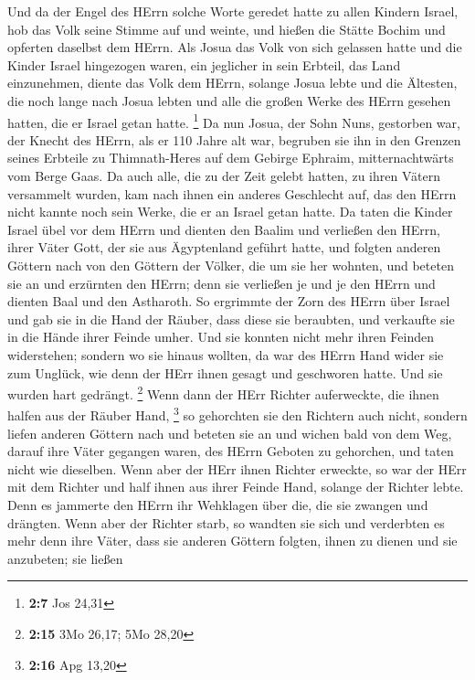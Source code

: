  Und da der Engel des HErrn solche Worte geredet hatte zu
allen Kindern Israel, hob das Volk seine Stimme auf und weinte,
 und hießen die Stätte Bochim und opferten daselbst dem
HErrn.  Als Josua das Volk von sich gelassen hatte und die
Kinder Israel hingezogen waren, ein jeglicher in sein Erbteil, das Land
einzunehmen,  diente das Volk dem HErrn, solange Josua lebte
und die Ältesten, die noch lange nach Josua lebten und alle die großen
Werke des HErrn gesehen hatten, die er Israel getan hatte. \footnote{\textbf{2:7}
  Jos 24,31}  Da nun Josua, der Sohn Nuns, gestorben war,
der Knecht des HErrn, als er 110 Jahre alt war,  begruben
sie ihn in den Grenzen seines Erbteile zu Thimnath-Heres auf dem Gebirge
Ephraim, mitternachtwärts vom Berge Gaas.  Da auch alle,
die zu der Zeit gelebt hatten, zu ihren Vätern versammelt wurden, kam
nach ihnen ein anderes Geschlecht auf, das den HErrn nicht kannte noch
sein Werke, die er an Israel getan hatte.  Da taten die
Kinder Israel übel vor dem HErrn und dienten den Baalim 
und verließen den HErrn, ihrer Väter Gott, der sie aus Ägyptenland
geführt hatte, und folgten anderen Göttern nach von den Göttern der
Völker, die um sie her wohnten, und beteten sie an und erzürnten den
HErrn;  denn sie verließen je und je den HErrn und dienten
Baal und den Astharoth.  So ergrimmte der Zorn des HErrn
über Israel und gab sie in die Hand der Räuber, dass diese sie
beraubten, und verkaufte sie in die Hände ihrer Feinde umher. Und sie
konnten nicht mehr ihren Feinden widerstehen;  sondern wo
sie hinaus wollten, da war des HErrn Hand wider sie zum Unglück, wie
denn der HErr ihnen gesagt und geschworen hatte. Und sie wurden hart
gedrängt. \footnote{\textbf{2:15} 3Mo 26,17; 5Mo 28,20} 
Wenn dann der HErr Richter auferweckte, die ihnen halfen aus der Räuber
Hand, \footnote{\textbf{2:16} Apg 13,20}  so gehorchten sie
den Richtern auch nicht, sondern liefen anderen Göttern nach und beteten
sie an und wichen bald von dem Weg, darauf ihre Väter gegangen waren,
des HErrn Geboten zu gehorchen, und taten nicht wie dieselben.
 Wenn aber der HErr ihnen Richter erweckte, so war der HErr
mit dem Richter und half ihnen aus ihrer Feinde Hand, solange der
Richter lebte. Denn es jammerte den HErrn ihr Wehklagen über die, die
sie zwangen und drängten.  Wenn aber der Richter starb, so
wandten sie sich und verderbten es mehr denn ihre Väter, dass sie
anderen Göttern folgten, ihnen zu dienen und sie anzubeten; sie ließen
